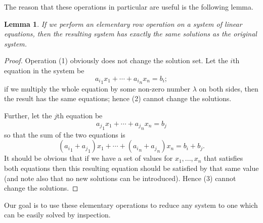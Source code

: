 \documentclass[a4paper,leqno]{article}
\numberwithin{equation}{section}
\newtheorem{lem}[equation]{Lemma}
\theoremstyle{definition}
\theoremstyle{remark}
\begin{document}
The reason that these operations in particular are useful is the following lemma.

\begin{lem}
  If we perform an elementary row operation on a system of linear equations, then the resulting system
  has exactly the same solutions as the original system.
\end{lem}
\begin{proof}
  Operation (1) obviously does not change the solution set. Let the $ i$th equation in the system be
  \begin{displaymath}
    {a_i}_1 x_1 + \cdots + {a_i}_n x_n = b_i;
  \end{displaymath}
  if we multiply the whole equation by some non-zero number $ \lambda $ on both sides, then the result has
  the same equations; hence (2) cannot change the solutions.

  Further, let the $ j$th equation be
  \begin{displaymath}
    {a_j}_1 x_1 + \cdots + {a_j}_n x_n = b_j
  \end{displaymath}
  so that the sum of the two equations is
  \begin{displaymath}
    ({a_i}_1 + {a_j}_1) x_1 + \cdots + ({a_i}_n + {a_j}_n) x_n = b_i + b_j.
  \end{displaymath}
  It should be obvious that if we have a set of values for $ x_1, ..., x_n $ that satisfies
  both equations then this resulting equation should be satisfied by that same value (and note
  also that no new solutions can be introduced). Hence (3) cannot change the solutions.
\end{proof}

Our goal is to use these elementary operations to reduce any system to one which can be easily solved by inspection.
\end{document}
